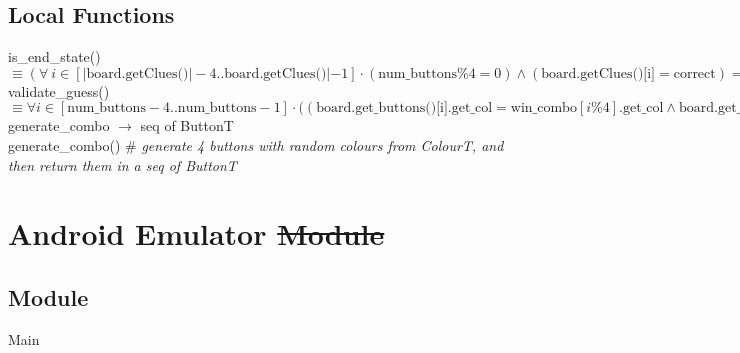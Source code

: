 \documentclass[12pt]{article}
\begin{document}
\subsection*{Local Functions}
\sloppy \noindent is\_end\_state() $\equiv (\forall \ i \in [|\text{board.getClues()}|-4..\text{board.getClues()}|-1]\cdot (\text{num\_buttons} \% 4 = 0)\land (\text{board.getClues()[i]}=\text{correct})\Rightarrow \text{winning}) \lor ((\text{num\_buttons}=\text{MAX\_ROWS}\times\text{MAX\_COLUMNS})\land(\exists\ i \in [\text{board.getClues()}|-4..\text{board.getClues()}|-1]\cdot \text{board.getClues()[i]} \neq \text{correct})\Rightarrow \text{losing}) \lor ((\text{num\_buttons} \le \text{MAX\_ROWS}\times\text{MAX\_COLUMNS}) \land (\exists \ i \in [|\text{board.getClues()}|-4..\text{board.getClues()}|-1]\cdot (\text{board.getClues()[i]}\neq \text{correct}) \Rightarrow \text{playing})$
\\

\noindent validate\_guess() $\equiv \forall i \in [\text{num\_buttons}-4..\text{num\_buttons}-1] \cdot \big((\text{board.get\_buttons()[i].get\_col} = \text{win\_combo}[i\% 4]\text{.get\_col} \land \text{board.get\_buttons()[i].get\_colour} = \text{win\_combo}[i\% 4]\text{.get\_colour}) \Rightarrow \text{board.add\_clue(correct,board.get\_buttons()[i].get\_row}\big) \lor \big((\text{board.get\_buttons()[i].get\_col} \neq \text{win\_combo}[i\% 4]\text{.get\_col} \land \text{board.get\_buttons()[i].get\_colour} = \text{win\_combo[i\% 4].get\_colour}) \Rightarrow \text{board.add\_clue(semicorrect,board.get\_buttons()[i].get\_row}\big) \lor \big((\text{board.get\_buttons()[i].get\_col} \neq \text{win\_combo[i\% 4].get\_col} \land \text{board.get\_buttons()[i].get\_colour} \neq \text{win\_combo[i\% 4].get\_colour}) \Rightarrow \text{board.add\_clue(incorrect,board.get\_buttons()[i].get\_row}\big)$\\

\noindent generate\_combo $\rightarrow$ seq of ButtonT\\ 
\noindent generate\_combo() \# \textit{generate 4 buttons with random colours from ColourT, and then return them in a seq of ButtonT}

\newpage


\section* {Android Emulator \sout{Module}}

\subsection*{Module}
Main
\end{document}
